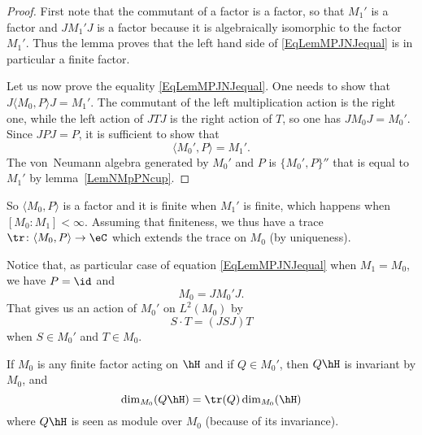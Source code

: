 \begin{proof}
First note that the commutant of a factor is a factor, so that $M_1'$ is a factor and $JM_1'J$ is a factor because it is algebraically isomorphic to the factor $M_1'$. Thus the lemma proves that the left hand side of \eqref{EqLemMPJNJequal} is in particular a finite factor.

Let us now prove the equality \eqref{EqLemMPJNJequal}. One needs to show that $J\langle M_0, P\rangle J=M_1'$. The commutant of the left multiplication action is the right one, while the left action of $JTJ$ is the right action of $T$, so one has $JM_0J=M_0'$. Since $JPJ=P$, it is sufficient to show that
\begin{equation}
	\langle M_0', P\rangle =M_1'.
\end{equation}
The von~Neumann algebra generated by $M_0'$ and $P$ is $\{ M_0',P \}''$ that is equal to $M_1'$ by lemma~\ref{LemNMpPNcup}.
\end{proof}
So $\langle M_0, P\rangle $ is a factor and it is finite when $M_1'$ is finite, which happens when $[M_0:M_1]<\infty$. Assuming that finiteness, we thus have a trace $\tr\colon \langle M_0, P\rangle \to \eC$ which extends the trace on $M_0$ (by uniqueness).

Notice that, as particular case of equation \eqref{EqLemMPJNJequal} when $M_1=M_0$, we have $P=\id$ and
\begin{equation}
	M_0=JM_0'J.
\end{equation}
That gives us an action of $M_0'$ on $L^2(M_0)$ by
\begin{equation}		\label{EqScdotTTSJT}
	S\cdot T=(JSJ)T
\end{equation}
when $S\in M_0'$ and $T\in M_0$.

\begin{proposition}		\label{PropdimMQhHQDIMMhH}
If $M_0$ is any finite factor acting on $\hH$ and if $Q\in M_0'$, then $Q\hH$ is invariant by $M_0$, and
\begin{equation}
	\dim_{M_0}(Q\hH)=\tr(Q)\dim_{M_0}(\hH)
\end{equation}
where $Q\hH$ is seen as module over $M_0$ (because of its invariance).
\end{proposition}

